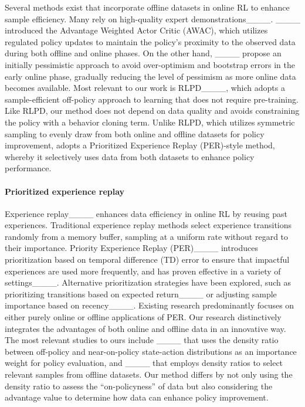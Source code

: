 Several methods exist that incorporate offline datasets in online RL to enhance sample efficiency. %
Many rely on high-quality expert demonstrations____. 
____ introduced the Advantage Weighted Actor Critic (AWAC), which utilizes regulated policy updates to maintain the policy's proximity to the observed data during both offline and online phases. On the other hand, ____ propose an initially pessimistic approach to avoid over-optimism and bootstrap errors in the early online phase, gradually reducing the level of pessimism as more online data becomes available.
Most relevant to our work is RLPD____, which %
adopts a sample-efficient off-policy approach to learning that does not require pre-training. Like RLPD, our method does not depend on data quality and avoids constraining the policy with a behavior cloning term. Unlike RLPD, which utilizes symmetric sampling to evenly draw from both online and offline datasets for policy improvement, \algname adopts a Prioritized Experience Replay (PER)-style method, whereby it selectively uses data from both datasets to enhance policy performance.















\paragraph{Prioritized experience replay}
\vspace{-0.3cm}
Experience replay____ enhances data efficiency in online RL by reusing past experiences.
Traditional experience replay methods select experience transitions randomly from a memory buffer, sampling at a uniform rate without regard to their importance. %
Priority Experience Replay (PER)____ introduces prioritization based on temporal difference (TD) error to ensure that impactful experiences are used more frequently, and has proven effective in a variety of settings____. 
Alternative prioritization strategies have been explored, such as prioritizing transitions based on expected return____ or adjusting sample importance based on recency____. 
Existing research predominantly focuses on either purely online or offline applications of PER. Our research distinctively integrates the advantages of both online and offline data in an innovative way. The most relevant studies to ours include ____ that uses the density ratio between off-policy and near-on-policy state-action distributions as an importance weight for policy evaluation, and ____ that employs density ratios to select relevant samples from offline datasets. Our method differs by not only using the density ratio to assess the ``on-policyness'' of data but also considering the advantage value to determine how data can enhance policy improvement.


